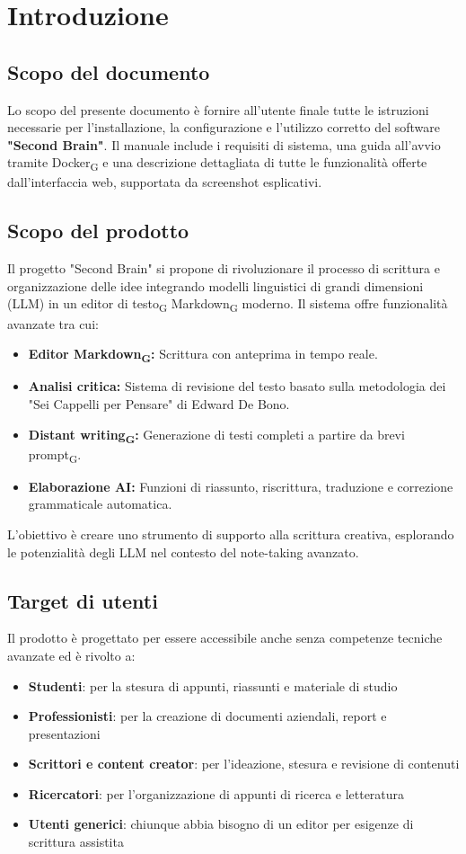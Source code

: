 \documentclass[11pt,a4paper]{article}
\newcommand{\gls}[1]{#1\textsubscript{G}}
\begin{document}
\section{Introduzione}
\subsection{Scopo del documento}
Lo scopo del presente documento è fornire all'utente finale tutte le istruzioni necessarie per l'installazione, la configurazione e l'utilizzo corretto del software \textbf{"Second Brain"}.  Il manuale include i requisiti di sistema, una guida all'avvio tramite \gls{Docker} e una descrizione dettagliata di tutte le funzionalità offerte dall'interfaccia web, supportata da screenshot esplicativi.

\subsection{Scopo del prodotto}
Il progetto "Second Brain" si propone di rivoluzionare il processo di scrittura e organizzazione delle idee integrando modelli linguistici di grandi dimensioni (LLM) in un \gls{editor di testo} \gls{Markdown} moderno. 
Il sistema offre funzionalità avanzate tra cui:
\begin{itemize}
    \item \textbf{Editor \gls{Markdown}:} Scrittura con anteprima in tempo reale.
    \item \textbf{Analisi critica:} Sistema di revisione del testo basato sulla metodologia dei "Sei Cappelli per Pensare" di Edward De Bono.
    \item \textbf{\gls{Distant writing}:} Generazione di testi completi a partire da brevi \gls{prompt}.
    \item \textbf{Elaborazione AI:} Funzioni di riassunto, riscrittura, traduzione e correzione grammaticale automatica.
\end{itemize}

L’obiettivo è creare uno strumento di supporto alla scrittura creativa, esplorando le potenzialità degli LLM nel contesto del note-taking avanzato.

\subsection{Target di utenti}
Il prodotto è progettato per essere accessibile anche senza competenze tecniche avanzate ed è rivolto a:
\begin{itemize}
    \item \textbf{Studenti}: per la stesura di appunti, riassunti e materiale di studio
    \item \textbf{Professionisti}: per la creazione di documenti aziendali, report e presentazioni
    \item \textbf{Scrittori e content creator}: per l'ideazione, stesura e revisione di contenuti
    \item \textbf{Ricercatori}: per l'organizzazione di appunti di ricerca e letteratura
    \item \textbf{Utenti generici}: chiunque abbia bisogno di un editor per esigenze di scrittura assistita
\end{itemize}
\end{document}
